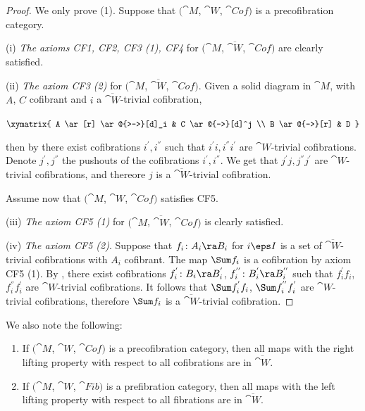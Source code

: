 \begin{proof}
We only prove (1). Suppose that $({\cat M}$, ${\cat W}$, ${\cat Cof})$ is a precofibration category. 

(i) {\it The axioms CF1, CF2, CF3 (1), CF4} for $({\cat M}$, $\overline{\cat W}$, ${\cat Cof})$ are clearly satisfied.

(ii) {\it The axiom CF3 (2)} for $({\cat M}$, $\overline{\cat W}$, ${\cat Cof})$. Given a solid diagram in ${\cat M}$, with $A$, $C$ cofibrant and $i$ a $\overline{\cat W}$-trivial cofibration,
\begin{center}
$ \xymatrix {
	A \ar[r] \ar@{>->}[d]_i &
	C \ar@{-->}[d]^j \\
	B \ar@{-->}[r] &
	D
	}$
\end{center}
then by  there exist cofibrations $i^{'}, i^{''}$ such that $i^{'}i, i^{''}i^{'}$ are ${\cat W}$-trivial cofibrations. Denote $j^{'}, j^{''}$ the pushouts of the cofibrations $i^{'}, i^{''}$. We get that $j^{'}j, j^{''}j^{'}$ are ${\cat W}$-trivial cofibrations, and thereore $j$ is a $\overline{\cat W}$-trivial cofibration.

Assume now that $({\cat M}$, ${\cat W}$, ${\cat Cof})$ satisfies CF5.

(iii) {\it The axiom CF5 (1)} for $({\cat M}$, $\overline{\cat W}$, ${\cat Cof})$ is clearly satisfied.

(iv) {\it The axiom CF5 (2)}. Suppose that $f_i \colon A_i \ra B_i$ for $i \eps I$ is a set of $\overline{\cat W}$-trivial cofibrations with $A_i$ cofibrant. The map $\Sum f_i$ is a cofibration by axiom CF5 (1). By , there exist cofibrations $f_i^{'} \colon B_i \ra B_i^{'}$, $f_i^{''} \colon B_i^{'} \ra B_i^{''}$ such that $f_i^{'}f_i$, $f_i^{''}f_i^{'}$ are ${\cat W}$-trivial cofibrations. It follows that $\Sum f_i^{'}f_i$, $\Sum f_i^{''}f_i^{'}$ are ${\cat W}$-trivial cofibrations, therefore $\Sum f_i$ is a $\overline{\cat W}$-trivial cofibration.
\end{proof}

We also note the following:

\begin{prop}
\label{prop:rightliftpropisweakequiv}
\mbox{}
\begin{enumerate}
\item
If $({\cat M}$, ${\cat W}$, ${\cat Cof})$ is a precofibration category, then all maps with the right lifting property with respect to all cofibrations are in $\overline{\cat W}$.
\item
If $({\cat M}$, ${\cat W}$, ${\cat Fib})$ is a prefibration category, then all maps with the left lifting property with respect to all fibrations are in $\overline{\cat W}$.
\end{enumerate}
\end{prop}

